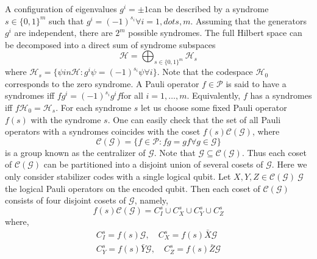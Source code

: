 A configuration  of  eigenvalues \(g^i=\pm 1\)can be described by a syndrome \(s \in \{0,1\}^{m}\) such that \(g^i = (-1)^{s_i} \forall i = 1, dots, m\). Assuming that the generators \(g^i\) are independent, there are \(2^m\) possible syndromes. The full Hilbert  space  can  be  decomposed  into a direct sum of syndrome subspaces
\begin{equation*}
    \mathcal{H} = \bigoplus_{s \in\{0,1\}^{m} }  \mathcal{H}_s
\end{equation*}
where \(\mathcal{H}_s = \{ \psi in \mathcal{H}: g^i \psi = (-1)^{s_i} \psi \forall i\}\). Note that the codespace \(\mathcal{H}_0\) corresponds to the zero syndrome. A Pauli operator \(f \in \mathcal{P}\) is said to have a syndromes iff \(f g^i = (-1)^{s_i} g^i f\)for all \(i = 1, \dots, m\). Equivalently, \(f\) has a syndromes iff \(f \mathcal{H}_0 = \mathcal{H}_s\). For each syndrome \(s\) let us choose some fixed Pauli operator \(f(s)\) with the syndrome \(s\). One can easily check that the set of all Pauli operators with  a  syndromes coincides with the coset \(f(s)\mathcal{C}(\mathcal{G})\), where
\begin{equation*}
    \mathcal{C}(\mathcal{G}) = \{ f \in \mathcal{P}: fg = gf \forall g \in \mathcal{G}\}
\end{equation*}
is a group known as the centralizer of \(\mathcal{G}\). Note that \(\mathcal{G} \subseteq \mathcal{C}(\mathcal{G})\). Thus each coset of \(\mathcal{C}(\mathcal{G})\) can be partitioned into a disjoint union of several cosets of \(\mathcal{G}\). Here we only consider stabilizer codes with a single logical  qubit. Let \(X, Y, Z \in \mathcal{C}(\mathcal{G}) \ \mathcal{G} \) the logical Pauli operators on the encoded qubit. Then each coset of \(\mathcal{C}(\mathcal{G})\) consists of four disjoint cosets of \(\mathcal{G}\), namely,
\begin{equation*}
    f(s) \mathcal{C}(\mathcal{G}) = C_{I}^{s} \cup C_{X}^{s} \cup C_{Y}^{s} \cup C_{Z}^{s}
\end{equation*}
where,
\begin{eqnarray*}
    C_{I}^{s} = f(s)\mathcal{G}, \quad C_{X}^{s} = f(s)\bar{X} \mathcal{G} \\
    C_{Y}^{s} = f(s)\bar{Y}\mathcal{G}, \quad C_{Z}^{s} = f(s)\bar{Z} \mathcal{G}
\end{eqnarray*}


